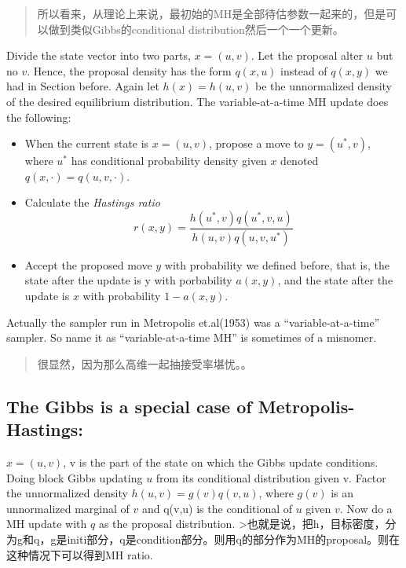 \documentclass[
]{book}
\providecommand{\tightlist}{%
  \setlength{\itemsep}{0pt}\setlength{\parskip}{0pt}}
\theoremstyle{definition}
\theoremstyle{definition}
\theoremstyle{definition}
\theoremstyle{remark}
\begin{document}
\begin{quote}
所以看来，从理论上来说，最初始的MH是全部待估参数一起来的，但是可以做到类似Gibbs的conditional distribution然后一个一个更新。
\end{quote}

Divide the state vector into two parts, \(x=(u,v)\). Let the proposal alter \(u\) but no \(v\). Hence, the proposal density has the form \(q(x,u)\) instead of \(q(x,y)\) we had in Section before. Again let \(h(x)=h(u,v)\) be the unnormalized density of the desired equilibrium distribution. The variable-at-a-time MH update does the following:

\begin{itemize}
\tightlist
\item
  When the current state is \(x=(u,v)\), propose a move to \(y=(u^*,v)\), where \(u^*\) has conditional probability density given \(x\) denoted \(q(x,\cdot)=q(u,v,\cdot)\).
\item
  Calculate the \emph{Hastings ratio}
  \[
  r(x, y)=\frac{h\left(u^{*}, v\right) q\left(u^{*}, v, u\right)}{h(u, v) q\left(u, v, u^{*}\right)}
  \]
\item
  Accept the proposed move \(y\) with probability we defined before, that is, the state after the update is y with porbability \(a(x,y)\), and the state after the update is \(x\) with probability \(1-a(x,y)\).
\end{itemize}

Actually the sampler run in Metropolis et.al(1953) was a ``variable-at-a-time'' sampler. So name it as ``variable-at-a-time MH'' is sometimes of a misnomer.

\begin{quote}
很显然，因为那么高维一起抽接受率堪忧。。
\end{quote}

\hypertarget{the-gibbs-is-a-special-case-of-metropolis-hastings}{%
\subsection{The Gibbs is a special case of Metropolis-Hastings:}\label{the-gibbs-is-a-special-case-of-metropolis-hastings}}

\(x=(u,v)\), v is the part of the state on which the Gibbs update conditions. Doing block Gibbs updating \(u\) from its conditional distribution given v. Factor the unnormalized density \(h(u,v)=g(v)q(v,u)\), where \(g(v)\) is an unnormalized marginal of \(v\) and q(v,u) is the conditional of \(u\) given \(v\). Now do a MH update with \(q\) as the proposal distribution.
\textgreater 也就是说，把h，目标密度，分为g和q，g是initi部分，q是condition部分。则用q的部分作为MH的proposal。则在这种情况下可以得到MH ratio.
\end{document}
